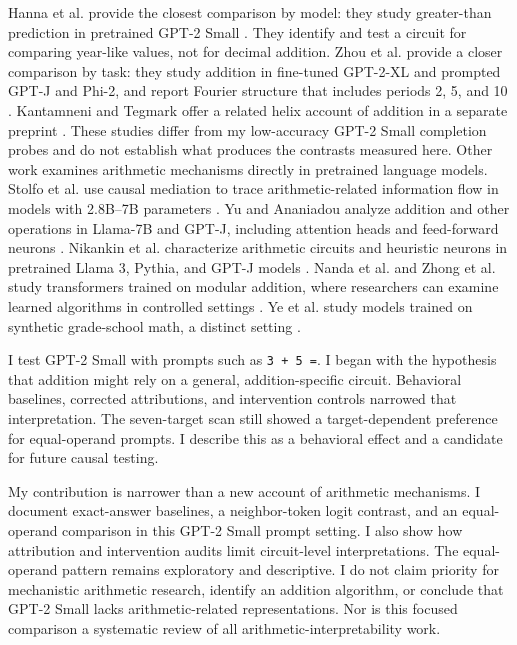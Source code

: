 \documentclass[11pt]{article}
\begin{document}
Hanna et al. provide the closest comparison by model: they study greater-than prediction in pretrained GPT-2 Small \cite{hanna2023greater}. They identify and test a circuit for comparing year-like values, not for decimal addition. Zhou et al. provide a closer comparison by task: they study addition in fine-tuned GPT-2-XL and prompted GPT-J and Phi-2, and report Fourier structure that includes periods 2, 5, and 10 \cite{zhou2024fourier}. Kantamneni and Tegmark offer a related helix account of addition in a separate preprint \cite{kantamneni2025trigonometry}. These studies differ from my low-accuracy GPT-2 Small completion probes and do not establish what produces the contrasts measured here. Other work examines arithmetic mechanisms directly in pretrained language models. Stolfo et al. use causal mediation to trace arithmetic-related information flow in models with 2.8B--7B parameters \cite{stolfo2023causal}. Yu and Ananiadou analyze addition and other operations in Llama-7B and GPT-J, including attention heads and feed-forward neurons \cite{yu2024cna}. Nikankin et al. characterize arithmetic circuits and heuristic neurons in pretrained Llama 3, Pythia, and GPT-J models \cite{nikankin2025heuristics}. Nanda et al. and Zhong et al. study transformers trained on modular addition, where researchers can examine learned algorithms in controlled settings \cite{nanda2023progress,zhong2023clock}. Ye et al. study models trained on synthetic grade-school math, a distinct setting \cite{ye2024physics}.

I test GPT-2 Small with prompts such as \texttt{3 + 5 =}. I began with the hypothesis that addition might rely on a general, addition-specific circuit. Behavioral baselines, corrected attributions, and intervention controls narrowed that interpretation. The seven-target scan still showed a target-dependent preference for equal-operand prompts. I describe this as a behavioral effect and a candidate for future causal testing.

My contribution is narrower than a new account of arithmetic mechanisms. I document exact-answer baselines, a neighbor-token logit contrast, and an equal-operand comparison in this GPT-2 Small prompt setting. I also show how attribution and intervention audits limit circuit-level interpretations. The equal-operand pattern remains exploratory and descriptive. I do not claim priority for mechanistic arithmetic research, identify an addition algorithm, or conclude that GPT-2 Small lacks arithmetic-related representations. Nor is this focused comparison a systematic review of all arithmetic-interpretability work.
\end{document}
